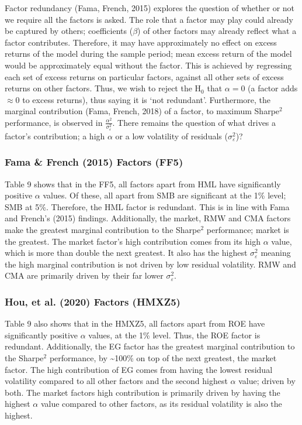 \documentclass[11pt, english]{article}
\begin{document}
	Factor redundancy (Fama, French, 2015) explores the question of whether or not we require all the factors is asked. The role that a factor may play could already be captured by others; coefficients ($\beta$) of other factors may already reflect what a factor contributes. Therefore, it may have approximately no effect on excess returns of the model during the sample period; mean excess return of the model would be approximately equal without the factor. This is achieved by regressing each set of excess returns on particular factors, against all other sets of excess returns on other factors. Thus, we wish to reject the H$_0$ that $\alpha=0$ (a factor adds $\approx 0$ to excess returns), thus saying it is `not redundant'. Furthermore, the marginal contribution (Fama, French, 2018) of a factor, to maximum Sharpe$^2$ performance, is observed in $\frac{\alpha^2}{\sigma_\varepsilon^2}$. There remains the question of what drives a factor's contribution; a high $\alpha$ or a low volatility of residuals ($\sigma_{\varepsilon}^2$)?

		\subsubsection{Fama \& French (2015) Factors (FF5)}

	Table 9 shows that in the FF5, all factors apart from HML have significantly positive $\alpha$ values. Of these, all apart from SMB are significant at the 1\% level; SMB at 5\%. Therefore, the HML factor is redundant. This is in line with Fama and French's (2015) findings. Additionally, the market, RMW and CMA factors make the greatest marginal contribution to the Sharpe$^2$ performance; market is the greatest. The market factor's high contribution comes from its high $\alpha$ value, which is more than double the next greatest. It also has the highest $\sigma_\varepsilon^2$ meaning the high marginal contribution is not driven by low residual volatility. RMW and CMA are primarily driven by their far lower $\sigma_\varepsilon^2$.

		\subsubsection{Hou, et al. (2020) Factors (HMXZ5)}

	Table 9 also shows that in the HMXZ5, all factors apart from ROE have significantly positive $\alpha$ values, at the 1\% level. Thus, the ROE factor is redundant. Additionally, the EG factor has the greatest marginal contribution to the Sharpe$^2$ performance, by \~{}100\% on top of the next greatest, the market factor. The high contribution of EG comes from having the lowest residual volatility compared to all other factors and the second highest $\alpha$ value; driven by both. The market factors high contribution is primarily driven by having the highest $\alpha$ value compared to other factors, as its residual volatility is also the highest.
\end{document}
